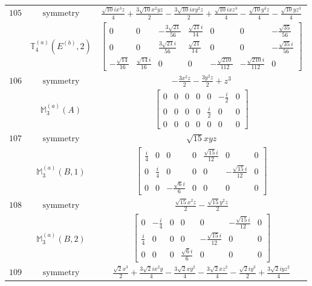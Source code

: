 \documentclass[fleqn,8pt,landscape]{jsarticle}
\begin{document}
\begin{longtable}{ccc}
$ 105 $ & $ \text{symmetry} $ & $ \frac{\sqrt{10} i x^{3} z}{4} + \frac{3 \sqrt{10} x^{2} y z}{2} - \frac{3 \sqrt{10} i x y^{2} z}{2} + \frac{\sqrt{10} i x z^{3}}{4} - \frac{\sqrt{10} y^{3} z}{4} - \frac{\sqrt{10} y z^{3}}{4} $ \\
$  $ & $ \mathbb{T}_{4}^{(a)}(E^{(b)},2) $ & $ \begin{bmatrix} 0 & 0 & - \frac{3 \sqrt{21}}{56} & \frac{\sqrt{21} i}{14} & 0 & 0 & - \frac{\sqrt{35}}{56} \\ 0 & 0 & \frac{3 \sqrt{21} i}{56} & \frac{\sqrt{21}}{14} & 0 & 0 & - \frac{\sqrt{35} i}{56} \\ - \frac{\sqrt{14}}{16} & \frac{\sqrt{14} i}{16} & 0 & 0 & - \frac{\sqrt{210}}{112} & - \frac{\sqrt{210} i}{112} & 0 \end{bmatrix} $ \\ \hline
$ 106 $ & $ \text{symmetry} $ & $ - \frac{3 x^{2} z}{2} - \frac{3 y^{2} z}{2} + z^{3} $ \\
$  $ & $ \mathbb{M}_{3}^{(a)}(A) $ & $ \begin{bmatrix} 0 & 0 & 0 & 0 & 0 & - \frac{i}{2} & 0 \\ 0 & 0 & 0 & 0 & \frac{i}{2} & 0 & 0 \\ 0 & 0 & 0 & 0 & 0 & 0 & 0 \end{bmatrix} $ \\ \hline
$ 107 $ & $ \text{symmetry} $ & $ \sqrt{15} x y z $ \\
$  $ & $ \mathbb{M}_{3}^{(a)}(B,1) $ & $ \begin{bmatrix} \frac{i}{4} & 0 & 0 & 0 & \frac{\sqrt{15} i}{12} & 0 & 0 \\ 0 & \frac{i}{4} & 0 & 0 & 0 & - \frac{\sqrt{15} i}{12} & 0 \\ 0 & 0 & - \frac{\sqrt{6} i}{6} & 0 & 0 & 0 & 0 \end{bmatrix} $ \\ \hline
$ 108 $ & $ \text{symmetry} $ & $ \frac{\sqrt{15} x^{2} z}{2} - \frac{\sqrt{15} y^{2} z}{2} $ \\
$  $ & $ \mathbb{M}_{3}^{(a)}(B,2) $ & $ \begin{bmatrix} 0 & - \frac{i}{4} & 0 & 0 & 0 & - \frac{\sqrt{15} i}{12} & 0 \\ \frac{i}{4} & 0 & 0 & 0 & - \frac{\sqrt{15} i}{12} & 0 & 0 \\ 0 & 0 & 0 & \frac{\sqrt{6} i}{6} & 0 & 0 & 0 \end{bmatrix} $ \\ \hline
$ 109 $ & $ \text{symmetry} $ & $ \frac{\sqrt{2} x^{3}}{2} + \frac{3 \sqrt{2} i x^{2} y}{4} - \frac{3 \sqrt{2} x y^{2}}{4} - \frac{3 \sqrt{2} x z^{2}}{4} - \frac{\sqrt{2} i y^{3}}{2} + \frac{3 \sqrt{2} i y z^{2}}{4} $ \\

\end{longtable}
\end{document}
